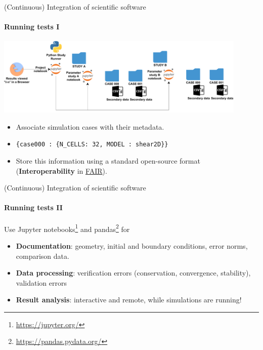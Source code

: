 \begin{frame}{(Continuous) Integration of scientific software} 
\framesubtitle{Running tests I}
\vfill

\begin{center}
    \includegraphics[width=0.9\textwidth]{figures/Cluster-Parameter-Study-Organization.pdf}
\end{center}

    \begin{itemize}
        \item Associate simulation cases with their metadata. 
        \item \texttt{\{case000 : \{N\_CELLS: 32, MODEL : shear2D\}\}}
        \item Store this information using a standard open-source format (\textbf{Interoperability} in \href{https://www.go-fair.org/fair-principles/}{FAIR}).
    \end{itemize}

\end{frame}

\begin{frame}{(Continuous) Integration of scientific software} 
\framesubtitle{Running tests II}
\vfill

    Use Jupyter notebooks\footnote{\href{https://jupyter.org/}{https://jupyter.org/}} and pandas\footnote{\href{https://pandas.pydata.org/}{https://pandas.pydata.org/}} for 
    \begin{itemize}
        \item \textbf{Documentation}: geometry, initial and boundary conditions, error norms, comparison data.
        \item \textbf{Data processing}: verification errors (conservation, convergence, stability), validation errors 
        \item \textbf{Result analysis}: interactive and remote, while simulations are running!
    \end{itemize}


\end{frame}

